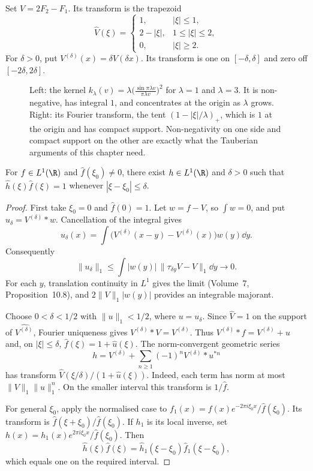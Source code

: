 Set $V=2F_2-F_1$. Its transform is the trapezoid
\[\hat V(\xi)=\begin{cases}1,&|\xi|\le1,\\2-|\xi|,&1\le|\xi|\le2,\\0,&|\xi|\ge2.\end{cases}\]
For $\delta>0$, put $V^{(\delta)}(x)=\delta V(\delta x)$. Its transform is one on $[-\delta,\delta]$ and zero off $[-2\delta,2\delta]$.
\begin{figure}[ht]
\centering
{}
\caption{Left: the kernel $k_\lambda(v)=\lambda\bigl(\frac{\sin\pi\lambda v}{\pi\lambda v}\bigr)^2$ for $\lambda=1$ and $\lambda=3$. It is non-negative, has
integral $1$, and concentrates at the origin as $\lambda$ grows. Right: its Fourier transform, the tent $(1-|\xi|/\lambda)_+$, which is $1$ at the origin and
has compact support. Non-negativity on one side and compact support on the other are exactly what the Tauberian arguments of this chapter need.}
\label{fig:fejerkernel}
\end{figure}

\begin{lemma}\label{lem:localinv}
For $f\in L^1(\R)$ and $\hat f(\xi_0)\ne0$, there exist $h\in L^1(\R)$ and $\delta>0$ such that $\hat h(\xi)\hat f(\xi)=1$ whenever $|\xi-\xi_0|\le\delta$.
\end{lemma}
\begin{proof}
First take $\xi_0=0$ and $\hat f(0)=1$. Let $w=f-V$, so $\int w=0$, and put $u_\delta=V^{(\delta)}*w$. Cancellation of the integral gives
\[u_\delta(x)=\int\bigl(V^{(\delta)}(x-y)-V^{(\delta)}(x)\bigr)w(y)\dd y.
\]
Consequently
\[\|u_\delta\|_1\le\int|w(y)|\,\|\tau_{\delta y}V-V\|_1\dd y\longrightarrow0.
\]
For each $y$, translation continuity in $L^1$ gives the limit (Volume~7, Proposition~10.8), and $2\|V\|_1|w(y)|$ provides an integrable majorant.

Choose $0<\delta<1/2$ with $\|u\|_1<1/2$, where $u=u_\delta$. Since $\hat V=1$ on the support of $\widehat{V^{(\delta)}}$, Fourier uniqueness gives $V^{(\delta)}*V=V^{(\delta)}$. Thus $V^{(\delta)}*f=V^{(\delta)}+u$ and, on $|\xi|\le\delta$, $\hat f(\xi)=1+\hat u(\xi)$. The norm-convergent geometric series
\[h=V^{(\delta)}+\sum_{n\ge1}(-1)^nV^{(\delta)}*u^{*n}\]
has transform $\hat V(\xi/\delta)/(1+\hat u(\xi))$. Indeed, each term has norm at most $\|V\|_1\|u\|_1^n$. On the smaller interval this transform is $1/\hat f$.

For general $\xi_0$, apply the normalised case to $f_1(x)=f(x)e^{-2\pi i\xi_0x}/\hat f(\xi_0)$. Its transform is $\hat f(\xi+\xi_0)/\hat f(\xi_0)$. If $h_1$ is its local inverse, set $h(x)=h_1(x)e^{2\pi i\xi_0x}/\hat f(\xi_0)$. Then
\[\hat h(\xi)\hat f(\xi)=\hat h_1(\xi-\xi_0)\hat f_1(\xi-\xi_0),\]
which equals one on the required interval.
\end{proof}


